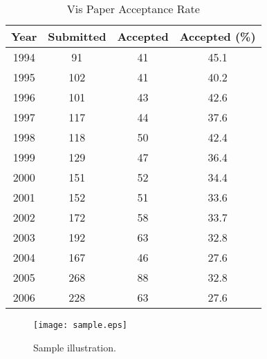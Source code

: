 \documentclass{vgtc}                          %
\begin{document}
\begin{table}
  \caption{Vis Paper Acceptance Rate}
  \label{vis_accept}
  \scriptsize
  \begin{center}
    \begin{tabular}{cccc}
      Year & Submitted & Accepted & Accepted (\%)\\
    \hline
      1994 &  91 & 41 & 45.1\\
      1995 & 102 & 41 & 40.2\\
      1996 & 101 & 43 & 42.6\\
      1997 & 117 & 44 & 37.6\\
      1998 & 118 & 50 & 42.4\\
      1999 & 129 & 47 & 36.4\\
      2000 & 151 & 52 & 34.4\\
      2001 & 152 & 51 & 33.6\\
      2002 & 172 & 58 & 33.7\\
      2003 & 192 & 63 & 32.8\\
      2004 & 167 & 46 & 27.6\\
      2005 & 268 & 88 & 32.8\\
      2006 & 228 & 63 & 27.6
    \end{tabular}
  \end{center}
\end{table}

\begin{figure}[htb]
  \centering
  \texttt{[image: sample.eps]}
  \caption{Sample illustration.}
\end{figure}




\end{document}
